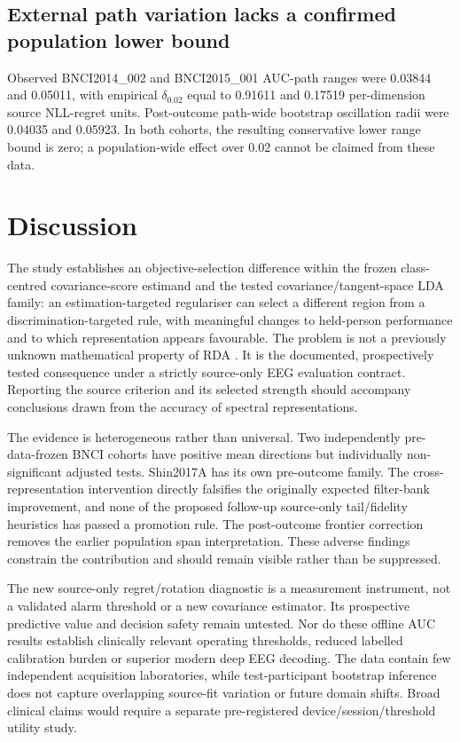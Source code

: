 \documentclass[11pt,a4paper]{article}
\begin{document}
\subsection{External path variation lacks a confirmed population lower bound}
Observed BNCI2014\_002 and BNCI2015\_001 AUC-path ranges were
0.03844 and 0.05011, with empirical \(\delta_{0.02}\) equal
to 0.91611 and 0.17519 per-dimension source NLL-regret units.
Post-outcome path-wide bootstrap oscillation radii were 0.04035
and 0.05923. In both cohorts, the resulting conservative
lower range bound is zero; a population-wide effect over 0.02
cannot be claimed from these data.







\section{Discussion}
The study establishes an objective-selection difference within the
frozen class-centred covariance-score estimand and the tested
covariance/tangent-space LDA family: an estimation-targeted regulariser
can select a different region from a discrimination-targeted rule, with
meaningful changes to held-person performance and to which
representation appears favourable. The problem is not a previously
unknown mathematical property of RDA \cite{friedman1989}.
It is the documented, prospectively tested consequence under a strictly
source-only EEG evaluation contract. Reporting the source criterion and
its selected strength should accompany conclusions drawn from the
accuracy of spectral representations.

The evidence is heterogeneous rather than universal. Two independently
pre-data-frozen BNCI cohorts have positive mean directions but individually
non-significant adjusted tests. Shin2017A has its own pre-outcome family.
The cross-representation intervention directly falsifies the originally
expected filter-bank improvement, and none of the proposed follow-up
source-only tail/fidelity heuristics has passed a promotion rule.
The post-outcome frontier correction removes the earlier population
span interpretation. These adverse findings constrain the contribution
and should remain visible rather than be suppressed.

The new source-only regret/rotation diagnostic is a measurement instrument,
not a validated alarm threshold or a new covariance estimator. Its
prospective predictive value and decision safety remain untested. Nor do
these offline AUC results establish clinically relevant operating thresholds,
reduced labelled calibration burden or superior modern deep EEG decoding.
The data contain few independent acquisition laboratories, while
test-participant bootstrap inference does not capture overlapping
source-fit variation or future domain shifts. Broad clinical claims
would require a separate pre-registered device/session/threshold utility study.
\end{document}
